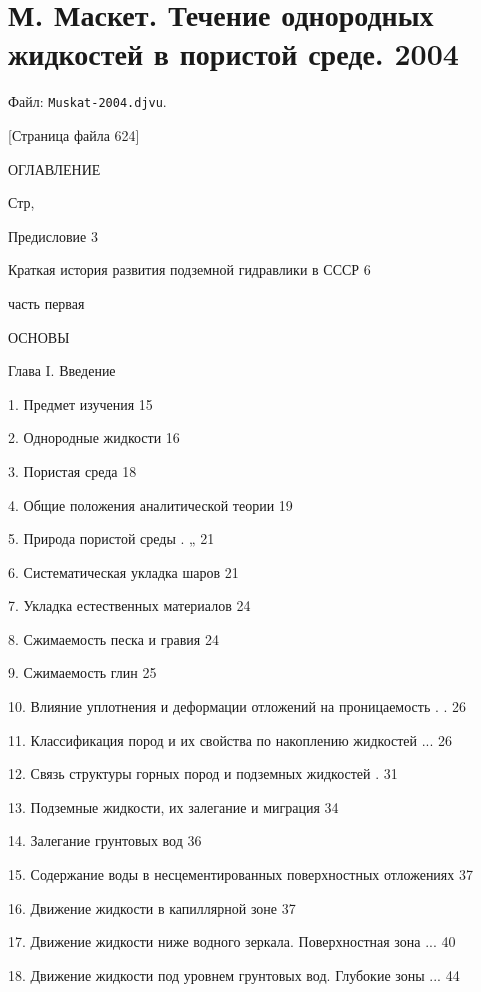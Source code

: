 \documentclass[
  11pt,
]{article}
\begin{document}

\section{М. Маскет. Течение однородных жидкостей в пористой среде. 2004}\label{section-11}

Файл: \texttt{Muskat-2004.djvu}.

\begingroup\small\setlength{\parindent}{0pt}\setlength{\parskip}{1pt}
{[}Страница файла 624{]}\par
ОГЛАВЛЕНИЕ \par
Стр, \par
Предисловие 3 \par
Краткая история развития подземной гидравлики в СССР 6 \par
часть первая \par
ОСНОВЫ \par
Глава I. Введение \par
1. Предмет изучения 15 \par
2. Однородные жидкости 16 \par
3. Пористая среда 18 \par
4. Общие положения аналитической теории 19 \par
5. Природа пористой среды . „ 21 \par
6. Систематическая укладка шаров 21 \par
7. Укладка естественных материалов 24 \par
8. Сжимаемость песка и гравия 24 \par
9. Сжимаемость глин 25 \par
10. Влияние уплотнения и деформации отложений на проницаемость . . 26 \par
11. Классификация пород и их свойства по накоплению жидкостей ... 26 \par
12. Связь структуры горных пород и подземных жидкостей . 31 \par
13. Подземные жидкости, их залегание и миграция 34 \par
14. Залегание грунтовых вод 36 \par
15. Содержание воды в несцементированных поверхностных отложениях 37 \par
16. Движение жидкости в капиллярной зоне 37 \par
17. Движение жидкости ниже водного зеркала. Поверхностная зона ... 40 \par
18. Движение жидкости под уровнем грунтовых вод. Глубокие зоны ... 44 \par
\end{document}
